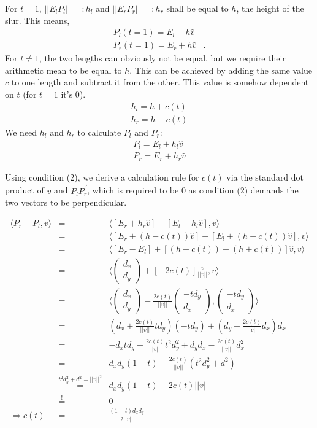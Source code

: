 \documentclass{article}
\begin{document}
For $t=1$, $||E_l P_l||=:h_l$ and $||E_r P_r||=:h_r$ shall be equal to $h$, the height of the slur.
This means,
$$\begin{matrix}
P_l(t=1)=E_l + h\hat{v}&\\
P_r(t=1)=E_r + h\hat{v}&.
\end{matrix}$$
For $t\ne 1$, the two lengths can obviously not be equal, but we require their arithmetic mean to be equal to $h$.
This can be achieved by adding the same value $c$ to one length and subtract it from the other.
This value is somehow dependent on $t$ (for $t=1$ it's 0).
\begin{equation}\begin{matrix}
h_l=h+c(t) \\
h_r=h-c(t)
\end{matrix}\end{equation}
We need $h_l$ and $h_r$ to calculate $P_l$ and $P_r$:
$$\begin{matrix}
P_l=E_l+h_l\hat{v}\\
P_r=E_r+h_r\hat{v}
\end{matrix}$$

Using condition (2), we derive a calculation rule for $c(t)$ via the standard dot product of $v$ and $\overrightarrow{P_l P_r}$,
which is required to be 0 as condition (2) demands the two vectors to be perpendicular.

\begin{eqnarray*}
\langle P_r-P_l, v\rangle &=& \langle [E_r+h_r\hat{v}]-[E_l+h_l\hat{v}],v\rangle\\
&=& \langle [E_r+(h-c(t))\hat{v}]-[E_l+(h+c(t))\hat{v}],v\rangle\\
&=& \langle [E_r-E_l] + [(h-c(t))-(h+c(t))]\hat{v},v\rangle\\
&=& \langle \begin{pmatrix}d_x\\d_y\end{pmatrix} + [-2c(t)]\frac{v}{||v||},v\rangle\\
&=& \langle \begin{pmatrix}d_x\\d_y\end{pmatrix} - \frac{2c(t)}{||v||}\begin{pmatrix}-td_y\\d_x\end{pmatrix},\begin{pmatrix}-td_y\\d_x\end{pmatrix}\rangle\\
&=& (d_x+\frac{2c(t)}{||v||}td_y)(-td_y)+(d_y-\frac{2c(t)}{||v||}d_x)d_x\\
&=& -d_xtd_y-\frac{2c(t)}{||v||}t^2d_y^2+d_yd_x-\frac{2c(t)}{||v||}d_x^2\\
&=& d_xd_y(1-t)-\frac{2c(t)}{||v||}(t^2d_y^2+d^2)\\
&\stackrel{t^2d_y^2+d^2=||v||^2}{=}& d_xd_y(1-t)-2c(t)||v||\\
&\stackrel{!}{=}&0\\
\Rightarrow c(t)&=& \frac{(1-t)d_xd_y}{2||v||}
\end{eqnarray*}
\end{document}
